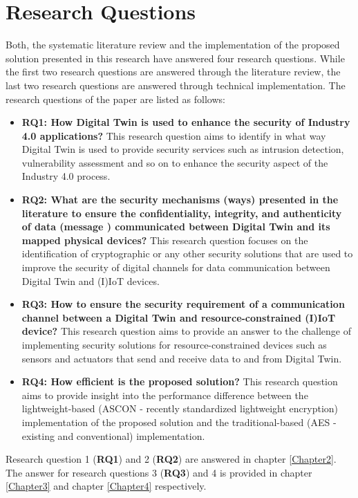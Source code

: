 \section{Research Questions}
Both, the systematic literature review and the implementation of the proposed solution presented in this research have answered four research questions. While the first two research questions are answered through the literature review, the last two research questions are answered through technical implementation. The research questions of the paper are listed as follows: 
\begin{itemize}
    \item \textbf{RQ1: How Digital Twin is used to enhance the security of Industry 4.0 applications?} \label{lbl:rq1} This research question aims to identify in what way Digital Twin is used to provide security services such as intrusion detection, vulnerability assessment and so on to enhance the security aspect of the Industry 4.0 process.
    \item \textbf{RQ2: What are the security mechanisms (ways) presented in the literature to ensure the confidentiality, integrity, and authenticity of data (message ) communicated between Digital Twin and its mapped physical devices?} This research question focuses on the identification of cryptographic or any other security solutions that are used to improve the security of digital channels for data communication between Digital Twin and (I)IoT devices. 
    \item \textbf{RQ3: How to ensure the security requirement of a communication channel between a Digital Twin and resource-constrained (I)IoT device?} This research question aims to provide an answer to the challenge of implementing security solutions for resource-constrained devices such as sensors and actuators that send and receive data to and from Digital Twin. 
    \item \textbf{RQ4: How efficient is the proposed solution?} This research question aims to provide insight into the performance difference between the lightweight-based (ASCON - recently standardized lightweight encryption) implementation of the proposed solution and the traditional-based (AES - existing and conventional) implementation. 
\end{itemize}

Research question 1 (\textbf{RQ1}) and 2 (\textbf{RQ2}) are answered in chapter \ref{Chapter2}. The answer for research questions 3 (\textbf{RQ3}) and 4 is provided in chapter \ref{Chapter3} and chapter \ref{Chapter4} respectively. 

